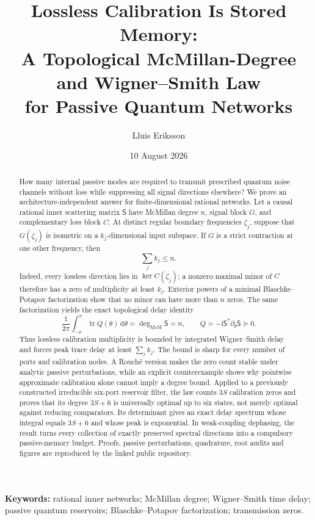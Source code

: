 \documentclass[11pt]{article}
\title{Lossless Calibration Is Stored Memory:\\
A Topological McMillan-Degree and Wigner--Smith Law\\
for Passive Quantum Networks}
\author{Lluis Eriksson}
\date{10 August 2026}
\theoremstyle{definition}
\theoremstyle{remark}
\newcommand{\tr}{\operatorname{tr}}
\newcommand{\dd}{\mathrm{d}}
\newcommand{\mcdeg}{\deg_{\mathrm{McM}}}
\begin{document}
\maketitle

\begin{abstract}
How many internal passive modes are required to transmit prescribed quantum
noise channels without loss while suppressing all signal directions
elsewhere?  We prove an architecture-independent answer for finite-dimensional
rational networks.  Let a causal rational inner scattering matrix
$\mathsf S$ have McMillan degree $n$, signal block $G$, and complementary loss
block $C$.  At distinct regular boundary frequencies $\zeta_j$, suppose that
$G(\zeta_j)$ is isometric on a $k_j$-dimensional input subspace.  If $G$ is a
strict contraction at one other frequency, then
\[
  \sum_j k_j\leq n.
\]
Indeed, every lossless direction lies in $\ker C(\zeta_j)$; a nonzero maximal
minor of $C$ therefore has a zero of multiplicity at least $k_j$.  Exterior
powers of a minimal Blaschke--Potapov factorization show that no minor can
have more than $n$ zeros.  The same factorization yields the exact topological
delay identity
\[
 \frac1{2\pi}\int_{-\pi}^{\pi}\tr Q(\theta)\,\dd\theta
 =\mcdeg\mathsf S=n,
 \qquad Q=-\mathrm{i}\mathsf S^*\partial_\theta\mathsf S\succeq0.
\]
Thus lossless calibration multiplicity is bounded by integrated
Wigner--Smith delay and forces peak trace delay at least $\sum_jk_j$.  The
bound is sharp for every number of ports and calibration nodes.  A Rouch\'e
version makes the zero count stable under analytic passive perturbations,
while an explicit counterexample shows why pointwise approximate calibration
alone cannot imply a degree bound.  Applied to a previously constructed
irreducible six-port reservoir filter, the law counts $3S$ calibration zeros
and proves that its degree $3S+6$ is universally optimal up to six states,
not merely optimal against reducing comparators.  Its determinant gives an
exact delay spectrum whose integral equals $3S+6$ and whose peak is
exponential.  In weak-coupling dephasing, the result turns every collection
of exactly preserved spectral directions into a compulsory passive-memory
budget.  Proofs, passive perturbations, quadrature, root audits and figures
are reproduced by the linked public repository.
\end{abstract}

\noindent\textbf{Keywords:} rational inner networks; McMillan degree;
Wigner--Smith time delay; passive quantum reservoirs; Blaschke--Potapov
factorization; transmission zeros.
\end{document}
